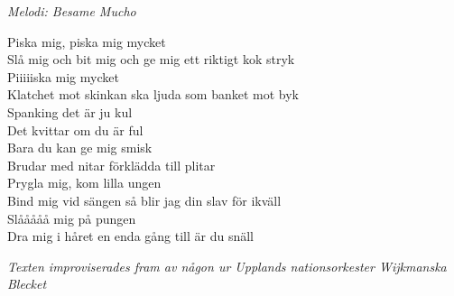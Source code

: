 {\footnotesize\textit{Melodi: Besame Mucho}}\par
\vspace{10pt}
Piska mig, piska mig mycket\\
Slå mig och bit mig och ge mig ett riktigt kok stryk\\
Piiiiiska mig mycket\\
Klatchet mot skinkan ska ljuda som banket mot byk\\
Spanking det är ju kul\\
Det kvittar om du är ful\\
Bara du kan ge mig smisk\\
Brudar med nitar förklädda till plitar\\
Prygla mig, kom lilla ungen\\
Bind mig vid sängen så blir jag din slav för ikväll\\
Slååååå mig på pungen\\
Dra mig i håret en enda gång till är du snäll\par
\vspace{10pt}
{\footnotesize\textit{Texten improviserades fram av någon ur Upplands nationsorkester Wijkmanska Blecket}}
